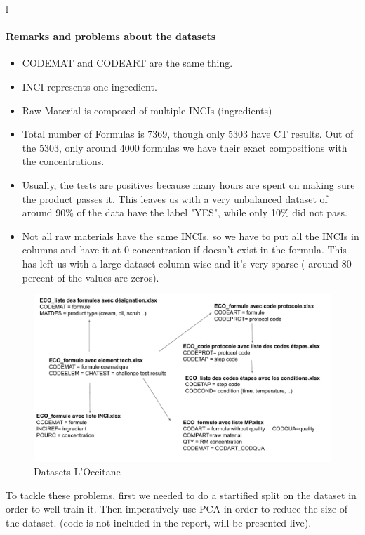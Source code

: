 l\documentclass[a4paper,12pt,twoside]{report}
\begin{document}
\paragraph{Remarks and problems about the datasets}
\begin{itemize} 
\item CODEMAT and CODEART are the same thing.
\item INCI represents one ingredient.
\item Raw Material is composed of multiple INCIs (ingredients)
\item Total number of Formulas is 7369, though only 5303 have CT results. Out of the 5303, only around 4000 formulas we have their exact compositions with the concentrations. 
\item Usually, the tests are positives because many hours are spent on making sure the product passes it. This leaves us with a very unbalanced dataset of around 90\% of the data have the label "YES", while only 10\% did not pass.
\item Not all raw materials have the same INCIs, so we have to put all the INCIs in columns and have it at 0 concentration if doesn't exist in the formula. This has left us with a large dataset column wise and it's very sparse ( around 80 percent of the values are zeros).
\end{itemize}
\begin{figure}[H]
		\includegraphics[width=\textwidth]{images/MCD_CT}
	\caption[MCD for L'Occiatane]{Datasets L'Occitane}
\label{MCD Challenge Test}
\end{figure}
To tackle these problems, first we needed to do a startified split on the dataset in order to well train it. Then imperatively use PCA in order to reduce the size of the dataset.
(code is not included in the report, will be presented live).
\end{document}
